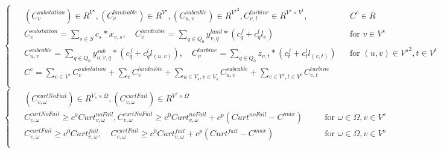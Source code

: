 \documentclass[a4paper,12pt]{article}
\begin{document}
    \begin{equation}
        \begin{cases}
            \begin{alignedat} {2}
                & (C_{v}^{substation}) \in R^{V^{s}}, (C_{v}^{landcable}) \in R^{V^{s}}, (C_{u,v}^{subcable}) \in R^{{V^{s}}^{2}}, C_{v,t}^{turbine} \in R^{V^{s} \times V^{t}}, && C^{c} \in R \\
                & C_{v}^{substation} = \sum_{s \in S} c_{s} * x_{v, s}, \quad C_{v}^{landcable} = \sum_{q \in Q_0} y_{v,q}^{land}*(c_{q}^{f} + c_{q}^{l} l_{e}) && \text{for }  v \in V^{s} \\
                & C_{u,v}^{subcable} = \sum_{q \in Q_0} y_{u,v,q}^{sub} * (c_{q}^{f}+c_{q}^{l} l_{(u,v)}),\quad C_{v}^{turbine} = \sum_{q \in Q_0} z_{v,t}*(c_{t}^{f} + c_{t}^{l} l_{(v,t)}) && \text{for }  (u,v) \in {V^{s}}^{2}, t \in V^{t} \\
                & C^{c} = \sum_{v \in V^s} C_{v}^{substation} + \sum_{v} C_{v}^{landcable} + \sum_{u \in V_{s},v \in V_{s}} C_{u,v}^{subcable} + \sum_{v \in V^s, t \in V^{t}} C_{v,t}^{turbine} \\
            \end{alignedat}
        \end{cases}
    \end{equation}
    \begin{equation}
        \begin{cases}
            \begin{alignedat}{2}
                & (C_{v,\omega}^{curtNoFail}) \in R^{V_{s} \times \Omega}, (C_{v,\omega}^{curtFail}) \in R^{V^{s} \times \Omega} \\
                & C_{v,\omega}^{curtNoFail} \geq c^{0}Curt_{v,\omega}^{noFail}, C_{v,\omega}^{curtNoFail} \geq c^{0}Curt_{v,\omega}^{noFail} + c^{p}(Curt^{noFail}-C^{max}) \quad &&  \text{for } \omega \in\Omega, v \in V^{s} \\
                & C_{v,\omega}^{curtFail} \geq c^{0}Curt_{v,\omega}^{fail}, \quad C_{v,\omega}^{curtFail} \geq c^{0}Curt_{v,\omega}^{fail} + c^{p}(Curt^{fail}-C^{max}) \quad && \text{for } \omega \in\Omega, v \in V^{s} \\
            \end{alignedat}
        \end{cases}
    \end{equation}
\end{document}
